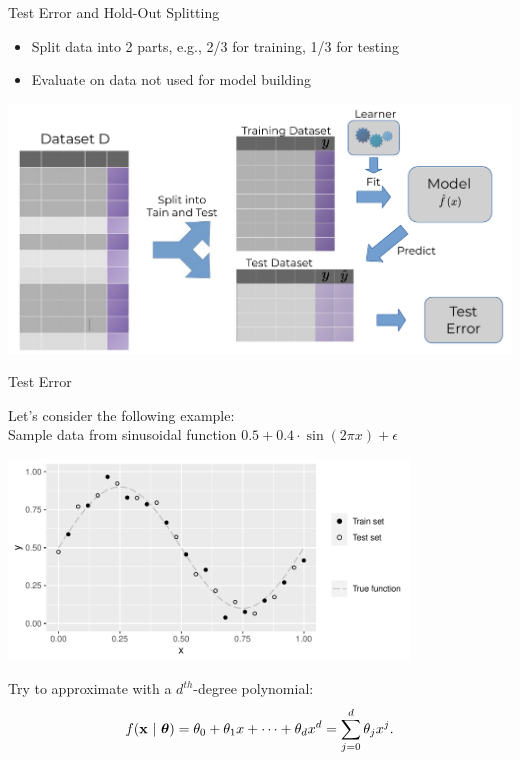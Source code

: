 \documentclass[11pt,compress,t,notes=noshow, xcolor=table]{beamer}
\newenvironment{knitrout}{}{} %
\begin{document}
\begin{vbframe}{Test Error and Hold-Out Splitting}
\begin{itemize}
  \item Split data into 2 parts, e.g., 2/3 for training, 1/3 for testing
  \item Evaluate on data not used for model building
\end{itemize}

\includegraphics[width=\textwidth]{figure_man/test_error.pdf}

\end{vbframe}

\begin{vbframe}{Test Error}

Let's consider the following example:\\
Sample data from sinusoidal function
$0.5 + 0.4 \cdot \sin (2 \pi x) + \epsilon$\\
\lz
\begin{knitrout}\scriptsize
{}\color{fgcolor}

{\centering \includegraphics[width=0.8\textwidth]{figure/eval_test_1} 

}



\end{knitrout}
Try to approximate with a $d^{th}$-degree polynomial:
\[ f(\mathbf{x} ~|~ \bm{\theta}) = \theta_0 + \theta_1 x + \cdots + \theta_d x^d = \sum_{j = 0}^{d} \theta_j x^j\text{.} \]
\end{vbframe}
\end{document}
